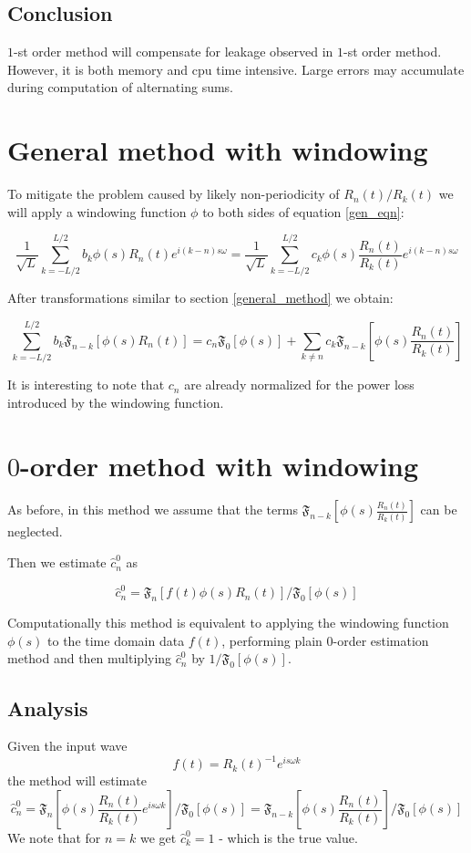 \documentclass[12pt]{article}
\def\FTC#1#2{{\mathfrak F}_{#1}\left[#2\right]}
\def\FFTNORM{\frac{1}{\sqrt{ L}}}
\begin{document}
\subsection{Conclusion}
$1$-st order method will compensate for leakage observed in $1$-st order method.
However, it is both memory and cpu time intensive. Large errors may accumulate
during computation of alternating sums.

\section{General method with windowing}
To mitigate the problem caused by likely non-periodicity of $R_n(t)/R_k(t)$
we will apply a windowing function $\phi$ to both sides of equation \ref{gen_eqn}:

\begin{equation} 
\label{gen_eqn}
\FFTNORM\sum_{k=-L/2}^{L/2}b_k \phi(s) R_n(t) e^{i(k-n)s\omega}=\FFTNORM\sum_{k=-L/2}^{L/2}c_k \phi(s) \frac{R_n(t)}{R_k(t)}e^{i(k-n)s\omega}
\end{equation}

After transformations similar to section \ref{general_method} we obtain:

$$
\sum_{k=-L/2}^{L/2} b_k \FTC{n-k}{\phi(s)R_n(t)}=c_n\FTC{0}{\phi(s)}+\sum_{k\neq n} c_k \FTC{n-k}{\phi(s)\frac{R_n(t)}{R_k(t)}}
$$

It is interesting to note that $c_n$ are already normalized for the power loss
introduced by the windowing function.

\section{$0$-order method with windowing}
As before, in this method we assume that the terms $\FTC{n-k}{\phi(s)\frac{R_n(t)}{R_k(t)}}$
can be neglected.

Then we estimate $\hat{c}^0_n$ as

$$
\hat{c}^0_n=\FTC{n}{f(t)\phi(s)R_n(t)}/\FTC{0}{\phi(s)}
$$

Computationally this method is equivalent to applying the windowing function
$\phi(s)$ to the time domain data $f(t)$, performing plain $0$-order estimation
method and then multiplying $\hat{c}^0_n$ by $1/\FTC{0}{\phi(s)}$.

\subsection{Analysis}
Given the input wave
$$
f(t)=R_k(t)^{-1}e^{is\omega k}
$$
the method will estimate
$$
\hat{c}^0_n=\FTC{n}{\phi(s)\frac{R_n(t)}{R_k(t)}e^{is\omega k}}/\FTC{0}{\phi(s)}=\FTC{n-k}{\phi(s)\frac{R_n(t)}{R_k(t)}}/\FTC{0}{\phi(s)}
$$
We note that for $n=k$ we get $\hat{c}^0_k=1$ - which is the true value.
\end{document}
